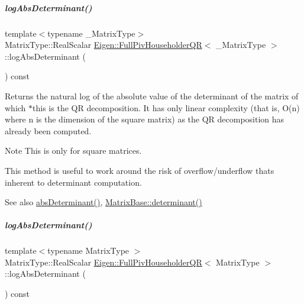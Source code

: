 \mbox{\label{group___q_r___module_a0e4fbf30f8f3418de5e54705659fc424}} 
\subparagraph{\texorpdfstring{log\+Abs\+Determinant()}{logAbsDeterminant()}\hspace{0.1cm}{\footnotesize\ttfamily [1/2]}}
{\footnotesize\ttfamily template$<$typename \+\_\+\+Matrix\+Type$>$ \\
Matrix\+Type\+::\+Real\+Scalar \hyperlink{group___q_r___module_class_eigen_1_1_full_piv_householder_q_r}{Eigen\+::\+Full\+Piv\+Householder\+QR}$<$ \+\_\+\+Matrix\+Type $>$\+::log\+Abs\+Determinant (\begin{DoxyParamCaption}{ }\end{DoxyParamCaption}) const}

\begin{DoxyReturn}{Returns}
the natural log of the absolute value of the determinant of the matrix of which $\ast$this is the QR decomposition. It has only linear complexity (that is, O(n) where n is the dimension of the square matrix) as the QR decomposition has already been computed.
\end{DoxyReturn}
\begin{DoxyNote}{Note}
This is only for square matrices.

This method is useful to work around the risk of overflow/underflow that\textquotesingle{}s inherent to determinant computation.
\end{DoxyNote}
\begin{DoxySeeAlso}{See also}
\hyperlink{group___q_r___module_a1029e1ccc70bb8669043c5775e7f3b75}{abs\+Determinant()}, \hyperlink{group___core___module_a7ad8f77004bb956b603bb43fd2e3c061}{Matrix\+Base\+::determinant()} 
\end{DoxySeeAlso}
\mbox{\label{group___q_r___module_aafde38918912c9b562f44b0fc3b22589}} 
\subparagraph{\texorpdfstring{log\+Abs\+Determinant()}{logAbsDeterminant()}\hspace{0.1cm}{\footnotesize\ttfamily [2/2]}}
{\footnotesize\ttfamily template$<$typename Matrix\+Type $>$ \\
Matrix\+Type\+::\+Real\+Scalar \hyperlink{group___q_r___module_class_eigen_1_1_full_piv_householder_q_r}{Eigen\+::\+Full\+Piv\+Householder\+QR}$<$ Matrix\+Type $>$\+::log\+Abs\+Determinant (\begin{DoxyParamCaption}{ }\end{DoxyParamCaption}) const}

